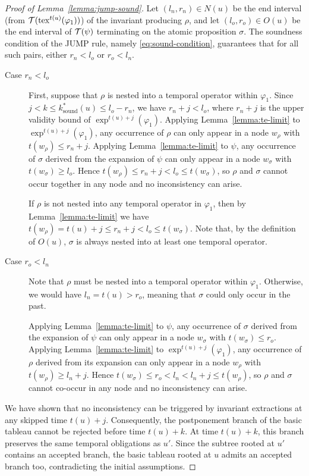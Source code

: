 \documentclass{easychair}
\begin{document}
\begin{proof}[Proof of Lemma~\ref{lemma:jump-sound}]
    Let $(l_n,r_n) \in N(u)$ be the end interval (from $\mathcal{T}(\operatorname{tex}^{t(u)}(\varphi_1))$) of the invariant producing $\rho$, and let $(l_o,r_o) \in O(u)$ be the end interval of $\mathcal{T}(\psi)$ terminating on the atomic proposition $\sigma$.
    The soundness condition of the \textsf{JUMP} rule, namely \eqref{eq:sound-condition}, guarantees that for all such pairs, either $r_n < l_o$ or $r_o < l_n$.

    \begin{description}
        \item[Case $r_n < l_o$] 
        First, suppose that $\rho$ is nested into a temporal operator within $\varphi_1$.
        Since $j < k \leq k^{\ast}_{\text{sound}}(u) \le l_o - r_n$, we have $r_n + j < l_o$, where $r_n + j$ is the upper validity bound of $\exp^{t(u) + j}(\varphi_1)$.
        Applying Lemma~\ref{lemma:te-limit} to $\exp^{t(u) + j}(\varphi_1)$, any occurrence of $\rho$ can only appear in a node $w_{\rho}$ with $t(w_{\rho}) \le r_n + j$.
        Applying Lemma~\ref{lemma:te-limit} to $\psi$, any occurrence of $\sigma$ derived from the expansion of $\psi$ can only appear in a node $w_{\sigma}$ with $t(w_{\sigma}) \ge l_o$.
        Hence $t(w_{\rho}) \le r_n + j < l_o \le t(w_{\sigma})$, so $\rho$ and $\sigma$ cannot occur together in any node and no inconsistency can arise.

        If $\rho$ is not nested into any temporal operator in $\varphi_1$, then by Lemma~\ref{lemma:te-limit} we have $t(w_{\rho}) = t(u) + j \leq r_n + j < l_o \le t(w_{\sigma})$.
        Note that, by the definition of $O(u)$, $\sigma$ is always nested into at least one temporal operator.
        
        \item[Case $r_o < l_n$]
        Note that $\rho$ must be nested into a temporal operator within $\varphi_1$. Otherwise, we would have $l_n = t(u) > r_o$, meaning that $\sigma$ could only occur in the past.

        Applying Lemma~\ref{lemma:te-limit} to $\psi$, any occurrence of $\sigma$ derived from the expansion of $\psi$ can only appear in a node $w_{\sigma}$ with $t(w_{\sigma}) \leq r_o$. 
        Applying Lemma~\ref{lemma:te-limit} to $\exp^{t(u) + j}(\varphi_1)$, any occurrence of $\rho$ derived from its expansion can only appear in a node $w_{\rho}$ with $t(w_{\rho}) \geq l_n + j$.
        Hence $t(w_{\sigma}) \leq r_o < l_n < l_n + j \leq t(w_{\rho})$, so $\rho$ and $\sigma$ cannot co-occur in any node and no inconsistency can arise.
    \end{description}

    We have shown that no inconsistency can be triggered by invariant extractions at any skipped time $t(u) + j$. 
    Consequently, the postponement branch of the basic tableau cannot be rejected before time $t(u)+k$. At time $t(u)+k$, this branch preserves the same temporal obligations as $u'$.
    Since the subtree rooted at $u'$ contains an accepted branch, the basic tableau rooted at $u$ admits an accepted branch too, contradicting the initial assumptions.
\end{proof}
\end{document}
